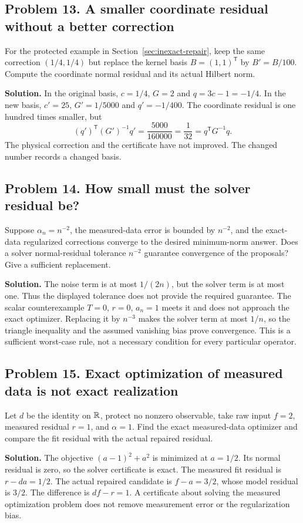 \subsection*{Problem 13. A smaller coordinate residual without a better correction}
For the protected example in Section~\ref{sec:inexact-repair}, keep the same correction $(1/4,1/4)$ but replace the kernel basis $B=(1,1)^{\mathsf T}$ by $B'=B/100$. Compute the coordinate normal residual and its actual Hilbert norm.

\textbf{Solution.} In the original basis, $c=1/4$, $G=2$ and $q=3c-1=-1/4$. In the new basis, $c'=25$, $G'=1/5000$ and $q'=-1/400$. The coordinate residual is one hundred times smaller, but
\[
 (q')^{\mathsf T}(G')^{-1}q'=\frac{5000}{160000}=\frac1{32}
 =q^{\mathsf T}G^{-1}q.
\]
The physical correction and the certificate have not improved. The changed number records a changed basis.

\subsection*{Problem 14. How small must the solver residual be?}
Suppose $\alpha_n=n^{-2}$, the measured-data error is bounded by $n^{-2}$, and the exact-data regularized corrections converge to the desired minimum-norm answer. Does a solver normal-residual tolerance $n^{-2}$ guarantee convergence of the proposals? Give a sufficient replacement.

\textbf{Solution.} The noise term is at most $1/(2n)$, but the solver term is at most one. Thus the displayed tolerance does not provide the required guarantee. The scalar counterexample $T=0$, $r=0$, $a_n=1$ meets it and does not approach the exact optimizer. Replacing it by $n^{-3}$ makes the solver term at most $1/n$, so the triangle inequality and the assumed vanishing bias prove convergence. This is a sufficient worst-case rule, not a necessary condition for every particular operator.

\subsection*{Problem 15. Exact optimization of measured data is not exact realization}
Let $d$ be the identity on $\mathbb R$, protect no nonzero observable, take raw input $f=2$, measured residual $r=1$, and $\alpha=1$. Find the exact measured-data optimizer and compare the fit residual with the actual repaired residual.

\textbf{Solution.} The objective $(a-1)^2+a^2$ is minimized at $a=1/2$. Its normal residual is zero, so the solver certificate is exact. The measured fit residual is $r-da=1/2$. The actual repaired candidate is $f-a=3/2$, whose model residual is $3/2$. The difference is $df-r=1$. A certificate about solving the measured optimization problem does not remove measurement error or the regularization bias.

